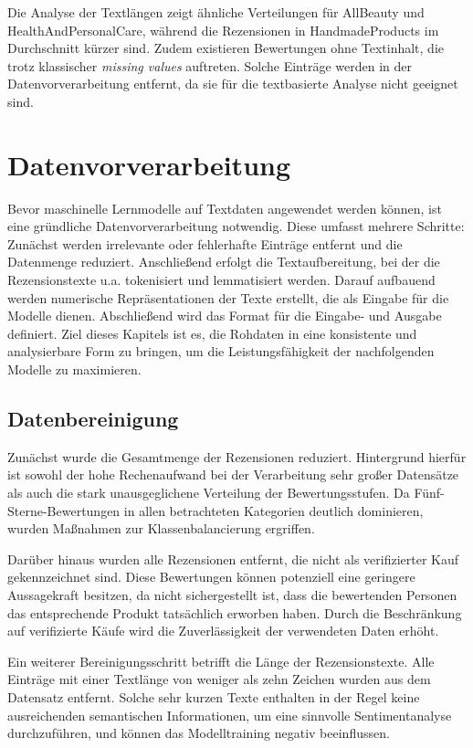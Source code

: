 Die Analyse der Textlängen zeigt ähnliche Verteilungen für AllBeauty und
HealthAndPersonalCare, während die Rezensionen in HandmadeProducts im
Durchschnitt kürzer sind. Zudem existieren Bewertungen ohne Textinhalt, die trotz
klassischer \textit{missing values} auftreten. Solche Einträge werden in der
Datenvorverarbeitung entfernt, da sie für die textbasierte Analyse nicht geeignet
sind.

\chapter{Datenvorverarbeitung}
Bevor maschinelle Lernmodelle auf Textdaten angewendet werden können, ist eine
gründliche Datenvorverarbeitung notwendig. Diese umfasst mehrere Schritte: Zunächst 
werden irrelevante
oder fehlerhafte Einträge entfernt und die Datenmenge
reduziert. Anschließend erfolgt die Textaufbereitung, bei der die Rezensionstexte
u.a. tokenisiert und lemmatisiert werden.
Darauf aufbauend werden numerische Repräsentationen der Texte erstellt,
die als Eingabe für die Modelle dienen. Abschließend wird das Format
für die Eingabe- und Ausgabe definiert. Ziel dieses Kapitels ist es, die
Rohdaten in eine konsistente und analysierbare Form zu bringen, um die
Leistungsfähigkeit der nachfolgenden Modelle zu maximieren.

\section{Datenbereinigung}
Zunächst wurde die Gesamtmenge der Rezensionen reduziert. Hintergrund hierfür
ist sowohl der hohe Rechenaufwand bei der Verarbeitung sehr großer Datensätze
als auch die stark unausgeglichene Verteilung der Bewertungsstufen. Da
Fünf-Sterne-Bewertungen in allen betrachteten Kategorien deutlich dominieren,
wurden Maßnahmen zur Klassenbalancierung ergriffen.

Darüber hinaus wurden alle Rezensionen entfernt, die nicht als verifizierter
Kauf gekennzeichnet sind. Diese Bewertungen können potenziell eine geringere
Aussagekraft besitzen, da nicht sichergestellt ist, dass die bewertenden
Personen das entsprechende Produkt tatsächlich erworben haben. Durch die
Beschränkung auf verifizierte Käufe wird die Zuverlässigkeit der verwendeten
Daten erhöht.

Ein weiterer Bereinigungsschritt betrifft die Länge der Rezensionstexte. Alle
Einträge mit einer Textlänge von weniger als zehn Zeichen wurden aus dem
Datensatz entfernt. Solche sehr kurzen Texte enthalten in der Regel keine
ausreichenden semantischen Informationen, um eine sinnvolle Sentimentanalyse
durchzuführen, und können das Modelltraining negativ beeinflussen.

